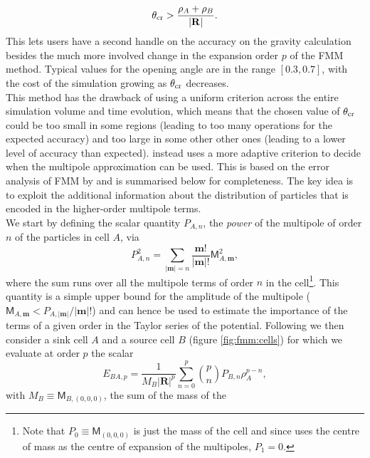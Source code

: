 \begin{equation}
  \theta_{\rm cr} > \frac{\rho_A + \rho_B} {|\mathbf{R}|}.
  \label{eq:fmm:angle}
\end{equation}
This lets users have a second handle on the accuracy on the gravity
calculation besides the much more involved change in the expansion order
$p$ of the FMM method. Typical values for the opening angle are in the
range $[0.3, 0.7]$, with the cost of the simulation growing as $\theta_{\rm
  cr}$ decreases. \\
This method has the drawback of using a uniform criterion across the entire
simulation volume and time evolution, which means that the chosen value of
$\theta_{\rm cr}$ could be too small in some regions (leading to too many
operations for the expected accuracy) and too large in some other other
ones (leading to a lower level of accuracy than expected). \swift instead
uses a more adaptive criterion to decide when the multipole approximation
can be used. This is based on the error analysis of FMM by
\cite{Dehnen2014} and is summarised below for completeness. The key idea is
to exploit the additional information about the distribution of particles
that is encoded in the higher-order multipole terms.\\
We start by defining the scalar quantity $P_{A,n}$, the
\emph{power} of the multipole of order $n$ of the particles in cell $A$,
via
\begin{equation}
  P_{A,n}^2 = \sum_{|\mathbf{m}|=n} \frac{\mathbf{m}!}{|\mathbf{m}|!}\mathsf{M}_{A,\mathbf{m}}^2,
\end{equation}
where the sum runs over all the multipole terms of order $n$ in the
cell\footnote{Note that $P_{0} \equiv \mathsf{M}_{(0,0,0)}$ is
  just the mass of the cell and since \swift uses the centre of mass as the
  centre of expansion of the multipoles, $P_{1} = 0$.}. This
quantity is a simple upper bound for the amplitude of the multipole
($\mathsf{M}_{A, \mathbf{m}} < P_{A,|\mathbf{m}|}/|\mathbf{m}|!$)
and can hence be used to estimate the importance of the terms of a given
order in the Taylor series of the potential. Following \cite{Dehnen2014} we
then consider a sink cell $A$ and a source cell $B$ (figure \ref{fig:fmm:cells}) for which we evaluate
at order $p$ the scalar
\begin{equation}
  E_{BA,p} = \frac{1}{M_B|\mathbf{R}|^p} \sum_{n=0}^p \binom{p}{n} P_{B,n}
  \rho_A^{p-n},
  \label{eq:fmm:e_ab}
\end{equation}
with $M_B \equiv \mathsf{M}_{B,(0,0,0)}$, the sum of the mass of the
